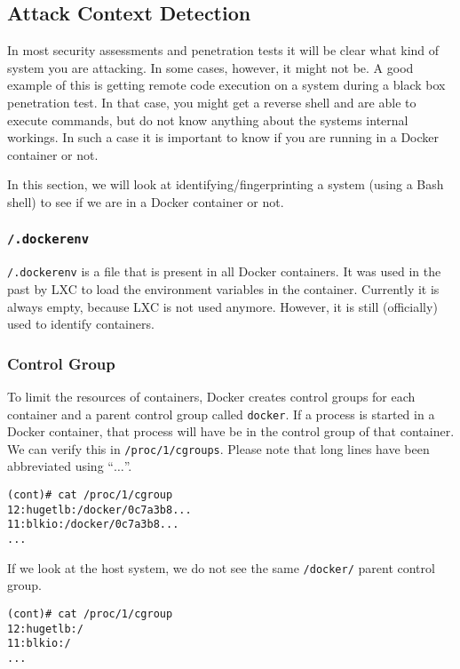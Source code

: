 \subsection{Attack Context Detection}
In most security assessments and penetration tests it will be clear what kind of system you are attacking. In some cases, however, it might not be. A good example of this is getting remote code execution on a system during a black box penetration test. In that case, you might get a reverse shell and are able to execute commands, but do not know anything about the systems internal workings. In such a case it is important to know if you are running in a Docker container or not.

In this section, we will look at identifying/fingerprinting a system (using a Bash shell) to see if we are in a Docker container or not.

\subsubsection{\texorpdfstring{\lstinline{/.dockerenv}}{/.dockerenv}}
\lstinline{/.dockerenv} is a file that is present in all Docker containers. It was used in the past by LXC to load the environment variables in the container. Currently it is always empty, because LXC is not used anymore. However, it is still (officially) used to identify containers\cite{Metasploit-Linux-Gather-Container-Detection}\cite{Removed-Dockerinit-Reference}.

\subsubsection{Control Group}
To limit the resources of containers, Docker creates control groups for each container and a parent control group called \lstinline{docker}. If a process is started in a Docker container, that process will have be in the control group of that container. We can verify this in \lstinline{/proc/1/cgroups}\cite{Metasploit-Linux-Gather-Container-Detection}. Please note that long lines have been abbreviated using ``$\ldots$''.

\begin{lstlisting}
(cont)# cat /proc/1/cgroup
12:hugetlb:/docker/0c7a3b8...
11:blkio:/docker/0c7a3b8...
...
\end{lstlisting}

If we look at the host system, we do not see the same \lstinline{/docker/} parent control group.

\begin{lstlisting}
(cont)# cat /proc/1/cgroup
12:hugetlb:/
11:blkio:/
...
\end{lstlisting}

